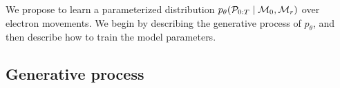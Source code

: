 We propose to learn a parameterized distribution $p_\theta( {\mathcal{P}}_{0:T} \mid {\mathcal{M}}_0, {\mathcal{M}}_r)$ over electron movements. 
We begin by describing the generative process %
of $p_\theta$, and then describe how to train the model parameters.


\subsection{Generative process}

%



